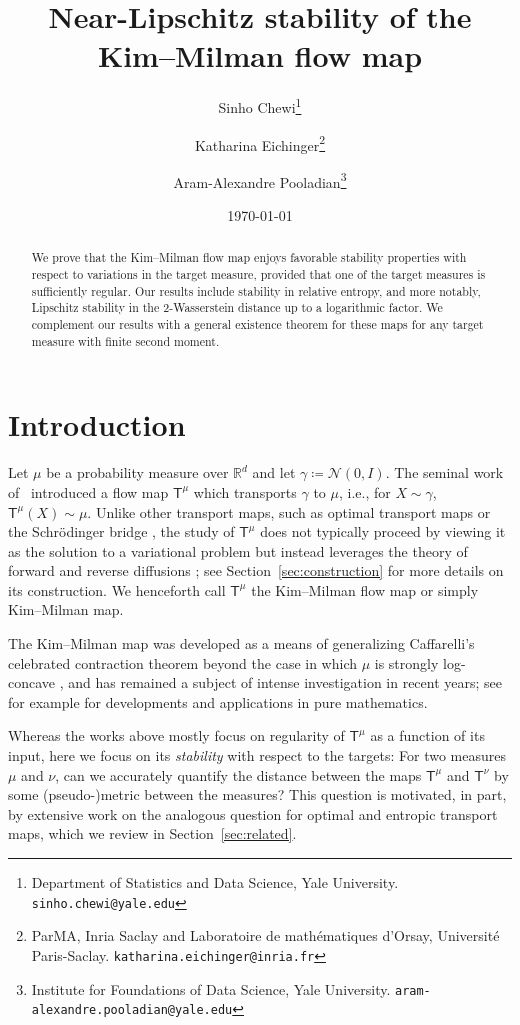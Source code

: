 \documentclass[12pt]{article}
\title{Near-Lipschitz stability of the 
Kim--Milman flow map}
\author{
Sinho Chewi\thanks{Department of Statistics and Data Science, Yale University. \tt{sinho.chewi@yale.edu}}\and 
Katharina Eichinger\thanks{ParMA, Inria Saclay and Laboratoire de mathématiques d’Orsay, Université Paris-Saclay. \tt katharina.eichinger@inria.fr}\and
Aram-Alexandre Pooladian\thanks{Institute for Foundations of Data Science, Yale University. \tt aram-alexandre.pooladian@yale.edu} 
}
\date{\today}
\newcommand{\cN}{\mathcal{N}}
\newcommand{\RR}{\mathbb{R}}
\newcommand{\R}{\RR}
\newcommand{\1}{\mathds{1}}
\newcommand{\deq}{\coloneqq}
\theoremstyle{plain}
\theoremstyle{definition}
\theoremstyle{remark}
\begin{document}
\maketitle
\begin{abstract}
We prove that the Kim--Milman flow map enjoys favorable stability properties with respect to variations in the target measure, provided that one of the {target} measures is sufficiently regular. Our results include stability in relative entropy, and more notably, Lipschitz stability in the $2$-Wasserstein distance  up to a logarithmic factor. We complement our results with a general existence theorem for these maps for any target measure with finite second moment.
\end{abstract}

\section{Introduction}
Let $\mu$ be a probability measure over $\R^d$ and let $\gamma \deq \cN(0,I)$. The seminal work of~\cite{kim2012generalization} introduced a flow map $\mathsf T^{\mu}$ which transports $\gamma$ to $\mu$, i.e., for $X \sim \gamma$, $\mathsf T^{\mu}(X)\sim\mu$. Unlike other transport maps, such as optimal transport maps \citep{brenier1991polar} or the Schr\"odinger bridge \citep{Leo14Schrodinger}, the study of $\mathsf T^{\mu}$ does not typically proceed by viewing it as the solution to a variational problem
but instead leverages the theory of forward and reverse diffusions \citep{Fol85}; see Section~\ref{sec:construction} for more details on its construction. We henceforth call $\mathsf T^\mu$ the Kim--Milman flow map or simply Kim--Milman map.

The Kim--Milman map was developed as a means of generalizing Caffarelli's celebrated contraction theorem beyond the case in which $\mu$ is strongly log-concave \citep{caffarelli2000monotonicity}, and has remained a subject of intense investigation in recent years; see for example \cite{neeman2022lipschitz, klartag2023spectral, MikShe23HeatFlow, fathi2024transportation, BriPed25HeatFlow,conforti2025coupling, ge2025generalization, lopez2025bakry, serres2026contractive} for developments and applications in pure mathematics.

Whereas the works above mostly focus on regularity of $\mathsf T^\mu$ as a function of its input, here we focus on its \emph{stability} with respect to the targets: For two measures $\mu$ and $\nu$, can we accurately quantify the distance between the maps $\mathsf T^\mu$ and $\mathsf T^\nu$
by some (pseudo-)metric between the measures? This question is motivated, in part, by extensive work on the analogous question for optimal and entropic transport maps, which we review in Section~\ref{sec:related}.
\end{document}
